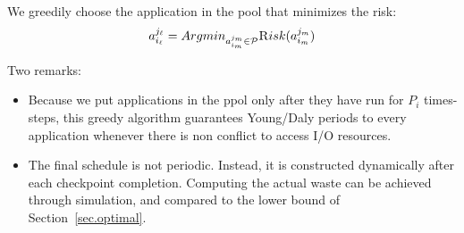 \documentclass{article}
\newcommand{\application}[2]{a_{#1}^{#2}}
\newcommand{\nbnodes}[1]{q_{#1}}
\newcommand{\period}[1]{P_{#1}}
\newcommand{\lastckpt}[2]{L_{#1}^{#2}}
\newcommand{\wastefct}[2]{W_{#1}(#2)}
\newcommand{\pool}{{\mathcal P}}
\newcommand{\risk}{{\textsc Risk}}
\begin{document}
We greedily choose the application in the pool that minimizes the risk:
$$\application{i_{\ell}}{j_{\ell}} = Argmin_{\application{i_m}{j_m} \in \pool} \risk(\application{i_m}{j_m})$$


Two remarks:
\begin{itemize}
\item Because we put applications in the ppol only after they have run for $P_{i}$ times-steps,
this greedy algorithm guarantees Young/Daly periods to every application
whenever there is non conflict to access I/O resources.
\item The final schedule is not periodic. Instead, it is constructed dynamically
after each checkpoint completion. Computing the actual waste can be achieved 
through simulation, and compared to the lower bound of Section~\ref{sec.optimal}. 
\end{itemize}




\end{document}
